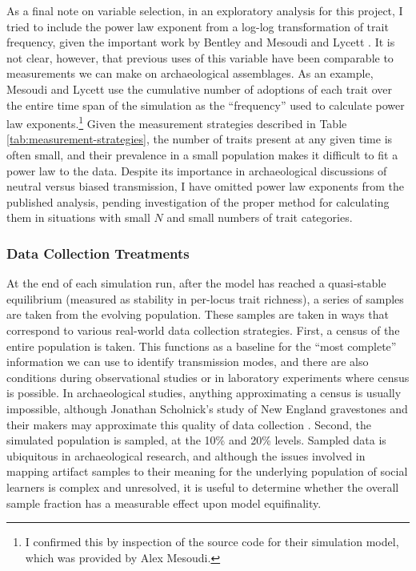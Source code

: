 As a final note on variable selection, in an exploratory analysis for this
project, I tried to include the power law exponent from a log-log
transformation of trait frequency, given the important work by Bentley
\cite{bentley2004random} and Mesoudi and Lycett
\cite{Mesoudi2009}. It is not clear, however, that previous uses
of this variable have been comparable to measurements we can make on
archaeological assemblages. As an example, Mesoudi and Lycett
\cite{Mesoudi2009} use the cumulative number of adoptions of each
trait over the entire time span of the simulation as the ``frequency''
used to calculate power law
exponents.\footnote{I confirmed this by inspection of the source code for their simulation model, which was provided by Alex Mesoudi.}
Given the measurement strategies described in Table
\ref{tab:measurement-strategies}, the number of traits present at any
given time is often small, and their prevalence in a small population
makes it difficult to fit a power law to the data. Despite its
importance in archaeological discussions of neutral versus biased
transmission, I have omitted power law exponents from the published
analysis, pending investigation of the proper method for calculating
them in situations with small \(N\) and small numbers of trait
categories.

\subsubsection{Data Collection Treatments}\label{data-collection-treatments}

At the end of each simulation run, after the model has reached a quasi-stable equilibrium (measured as stability in per-locus trait richness), a series of samples are taken from the evolving population.  These samples are taken in ways that correspond to various real-world data collection strategies.  First, a census of the entire population is taken.  This functions as a baseline for the ``most complete'' information we can use to identify transmission modes, and there are also conditions during observational studies or in laboratory experiments where census is possible.  In archaeological studies, anything approximating a census is usually impossible, although Jonathan Scholnick's study of New England gravestones and their makers may approximate this quality of data collection \cite{scholnick2012spatial}.  Second, the simulated population is sampled, at the 10\% and 20\% levels.  Sampled data is ubiquitous in archaeological research, and although the issues involved in mapping artifact samples to their meaning for the underlying population of social learners is complex and unresolved, it is useful to determine whether the overall sample fraction has a measurable effect upon model equifinality.  

